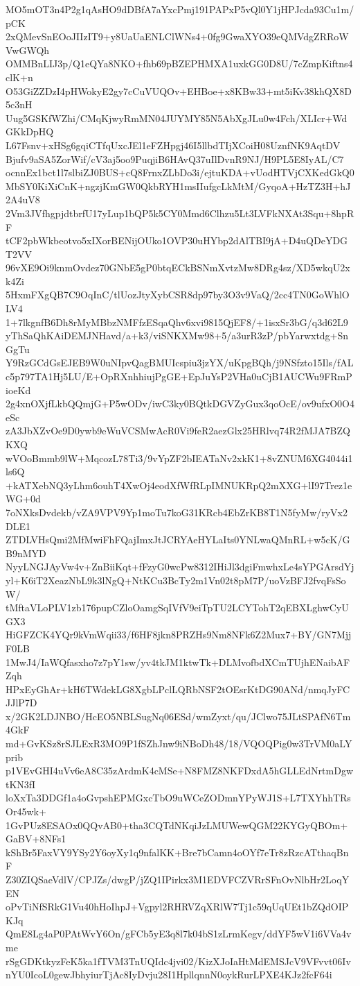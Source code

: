 MO5mOT3n4P2g1qAsHO9dDBfA7aYxcPmj191PAPxP5vQl0Y1jHPJcda93Cu1m/pCK
2xQMevSnEOoJIIzIT9+y8UaUaENLClWNs4+0fg9GwaXYO39eQMVdgZRRoWVwGWQh
OMMBnLIJ3p/Q1eQYa8NKO+fhb69pBZEPHMXA1uxkGG0D8U/7cZmpKiftns4clK+n
O53GiZZDzI4pHWokyE2gy7cCuVUQOv+EHBoe+x8KBw33+mt5iKv38khQX8D5c3nH
Uug5GSKfWZhi/CMqKjwyRmMN04JUYMY85N5AbXgJLu0w4Fch/XLIcr+WdGKkDpHQ
L67Fsnv+xHSg6gqiCTfqUxcJEl1eFZHpgj46I5llbdTIjXCoiH08UznfNK9AqtDV
Bjufv9aSA5ZorWif/cV3aj5oo9PuqjiB6HAvQ37uIlDvnR9NJ/H9PL5E8IyAL/C7
ocnnEx1bct1l7slbiZJ0BUS+cQ8FrnxZLbDo3i/ejtuKDA+vUodHTVjCXKedGkQ0
MbSY0KiXiCnK+ngzjKmGW0QkbRYH1msIIufgcLkMtM/GyqoA+HzTZ3H+hJ2A4uV8
2Vm3JVfhgpjdtbrfU17yLup1bQP5k5CY0Mmd6Clhzu5Lt3LVFkNXAt3Squ+8hpRF
tCF2pbWkbeotvo5xIXorBENijOUko1OVP30uHYbp2dAlTBI9jA+D4uQDeYDGT2VV
96vXE9Oi9knmOvdez70GNbE5gP0btqECkBSNmXvtzMw8DRg4sz/XD5wkqU2xk4Zi
5HxmFXgQB7C9OqInC/tlUozJtyXybCSR8dp97by3O3v9VaQ/2cc4TN0GoWhlOLV4
1+7lkgnfB6Dh8rMyMBbzNMFfzESqaQhv6xvi9815QjEF8/+1isxSr3bG/q3d62L9
yThSaQhKAiDEMJNHavd/a+k3/viSNKXMw98+5/a3urR3zP/pbYarwxtdg+SnGgTu
Y9RzGCdGsEJEB9W0uNIpvQagBMUIcspiu3jzYX/uKpgBQh/j9NSfzto15Ils/fAL
c5p797TA1Hj5LU/E+OpRXnhhiujPgGE+EpJuYsP2VHa0uCjB1AUCWu9FRmPioeKd
2g4xnOXjfLkbQQmjG+P5wODv/iwC3ky0BQtkDGVZyGux3qoOcE/ov9ufxO0O4eSc
zA3JbXZvOe9D0ywb9eWuVCSMwAcR0Vi9feR2aezGlx25HRlvq74R2fMJA7BZQKXQ
wVOoBmmb9lW+MqcozL78Ti3/9vYpZF2bIEATaNv2xkK1+8vZNUM6XG4044i1ls6Q
+kATXebNQ3yLhm6ouhT4XwOj4eodXfWfRLpIMNUKRpQ2mXXG+lI97Trez1eWG+0d
7oNXksDvdekb/vZA9VPV9Yp1moTu7koG31KRcb4EbZrKB8T1N5fyMw/ryVx2DLE1
ZTDLVHsQmi2MfMwiFhFQajImxJtJCRYAeHYLaIts0YNLwaQMnRL+w5cK/GB9nMYD
NyyLNGJAyVw4v+ZnBiiKqt+fFzyG0wcPw8312IHiJl3dgiFmwhxLe4sYPGArsdYj
yl+K6iT2XeazNbL9k3lNgQ+NtKCu3BcTy2m1Vn02t8pM7P/uoVzBFJ2fvqFsSoW/
tMftaVLoPLV1zb176pupCZloOamgSqIVfV9eiTpTU2LCYTohT2qEBXLghwCyUGX3
HiGFZCK4YQr9kVmWqii33/f6HF8jkn8PRZHs9Nm8NFk6Z2Mux7+BY/GN7MjjF0LB
1MwJ4/IaWQfasxho7z7pY1sw/yv4tkJM1ktwTk+DLMvofbdXCmTUjhENaibAFZqh
HPxEyGhAr+kH6TWdekLG8XgbLPclLQRbNSF2tOEsrKtDG90ANd/nmqJyFCJJlP7D
x/2GK2LDJNBO/HcEO5NBLSugNq06ESd/wmZyxt/qu/JClwo75JLtSPAfN6Tm4GkF
md+GvKSz8rSJLExR3MO9P1fSZhJnw9iNBoDh48/18/VQOQPig0w3TrVM0aLYprib
p1VEvGHI4uVv6eA8C35zArdmK4cMSe+N8FMZ8NKFDxdA5hGLLEdNrtmDgwtKN3fI
loXxTa3DDGf1a4oGvpshEPMGxcTbO9uWCeZODmnYPyWJ1S+L7TXYhhTRsOr45wk+
1GvPUz8ESAOx0QQvAB0+tha3CQTdNKqiJzLMUWewQGM22KYGyQBOm+GaBV+8NFs1
kShBr5FaxVY9YSy2Y6oyXy1q9nfalKK+Bre7bCamn4oOYf7eTr8zRzcATthaqBnF
Z30ZIQSaeVdlV/CPJZs/dwgP/jZQ1IPirkx3M1EDVFCZVRrSFnOvNlbHr2LoqYEN
oPvTiNfSRkG1Vu40hHoIhpJ+Vgpyl2RHRVZqXRlW7Tj1c59qUqUEt1bZQdOIPKJq
QmE8Lg4aP0PAtWvY6On/gFCb5yE3q8l7k04bS1zLrmKegv/ddYF5wV1i6VVa4vme
rSgGDKtkyzFeK5ka1fTVM3TnUQIdc4jvi02/KizXJoIaHtMdEMSJcV9VFvvt06Iv
nYU0IcoL0gewJbhyiurTjAc8IyDvju28I1HpllqnnN0oykRurLPXE4KJz2fcF64i
